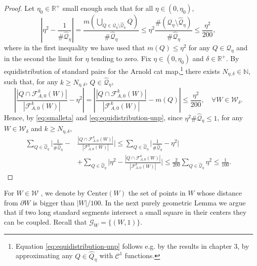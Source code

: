 \documentclass{amsart}
\numberwithin{equation}{section}
\renewcommand{\ge}{\geqslant}
\renewcommand{\le}{\leqslant}
\newcommand\cC{{\mathcal C}}
\newcommand\cF{{\mathcal F}}
\newcommand\cG{{\mathcal G}}
\newcommand\cQ{{\mathcal Q}}
\newcommand\cW{{\mathcal W}}
\newcommand\bN{{\mathbb N}}
\newcommand\bR{{\mathbb R}}
\newcommand{\cato}{\cF_{A,0}}
\newcommand{\Center}{\text{Center}}
\begin{document}
\begin{proof}
Let \(\eta_0 \in \bR^+\) small enough such that for all \(\eta \in (0, \eta_0)\),
\begin{equation}\label{eq:smalleta}
\left|\eta^2 - \frac{1}{\# \widehat \cQ_{\eta}} \right| = \frac{m \left(\bigcup_{Q \in \cQ_{\eta} \setminus \widehat \cQ_{\eta}} Q\right)}{\#\widehat \cQ_{\eta}} \le \eta^2\frac{\# (\cQ_{\eta} \setminus \widehat \cQ_{\eta})}{\#\widehat \cQ_{\eta}} \le \frac{\eta^2}{200},
\end{equation}
where in the first inequality we have used that \(m(Q) \le \eta^2\) for any \(Q \in \cQ_{\eta}\) and in the second the limit for \(\eta\) tending to zero. Fix \(\eta \in (0, \eta_0)\) and \(\delta \in \bR^+\). By equidistribution of standard pairs for the Arnold cat map,\footnote{Equation \eqref{eq:equidistribution-unp} follows e.g. by the results in \cite{DKL21} chapter 3, by approximating any \(Q \in \widehat{Q}_{\eta}\) with \(\cC^1\) functions.} there exists \(N_{\eta, \delta} \in \bN\), such that, for any \(k \ge N_{\eta,\delta}\), \(Q \in \widehat \cQ_{\eta}\),
\begin{equation}\label{eq:equidistribution-unp}
\left|\frac{\left|Q \cap \cato^k (W)\right|}{\left|\cato^k (W)\right|} - \eta^2 \right| = \left|\frac{\left|Q \cap \cato^k (W)\right|}{\left|\cato^k (W)\right|} - m(Q) \right| \le \frac{\eta^2}{200}, \quad  \forall W \in \cW_{\delta}.
\end{equation}
Hence, by \eqref{eq:smalleta} and \eqref{eq:equidistribution-unp}, since \(\eta^2 \#\widehat \cQ_{\eta}\le 1\), for any \(W \in \cW_{\delta}\) and \(k \ge N_{\eta, \delta}\),
\[ 
\begin{split}
    \sum_{Q \in \widehat \cQ_{\eta}} \biggl| \frac{1}{\# \widehat \cQ_{\eta}} - &\frac{\left|Q \cap \cato^k(W)\right|}{\left|\cato^k (W) \right|}\biggr| \le \sum_{Q \in \widehat \cQ_{\eta}} \biggl| \frac{1}{\# \widehat \cQ_{\eta}} - \eta^2\biggr|\\
    &+ \sum_{Q \in \widehat \cQ_{\eta}} \biggl|\eta^2 - \frac{\left|Q \cap \cato^k(W)\right|}{\left|\cato^k (W) \right|}\biggr|\le \frac{2}{200}  \sum_{Q \in \widehat \cQ_{\eta}} \eta^2 \le \frac{1}{100}.
\end{split}
\]
\end{proof}
For \(W \in \cW\) , we denote by \(\Center(W)\) the set of points in \(W\) whose distance from \(\partial W\) is bigger than \(|W|/100\). In the next purely geometric Lemma we argue that if two long standard segments intersect a small square in their centers they can be coupled. Recall that \(\cG_{W} = \{(W,1)\}\).
\end{document}
